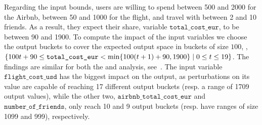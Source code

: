 %
%
Regarding the input bounds, users are willing to spend between 500 and 2000 for the Airbnb, between 50 and 1000 for the flight, and travel with between 2 and 10 friends. As a result, they expect their share, variable $\texttt{total\_cost\_eur}$, to be between 90 and 1900.
To compute the impact of the input variables we choose the output buckets to cover the expected output space in buckets of size $100$, \ie, $\{100t + 90 \le \texttt{total\_cost\_eur} < \min \{100(t + 1) + 90, 1900\} \mid 0 \le t \le 19\}$.
The %
findings are similar for both the \outcomesname{} and \rangename{} analysis, see~.
The input variable $\texttt{flight\_cost\_usd}$ has the biggest impact on the output, as perturbations on its value are capable of reaching 17 different output buckets (resp. a range of 1709 output values), while the other two, $\texttt{airbnb\_total\_cost\_eur}$ and $\texttt{number\_of\_friends}$, only reach 10 and 9 output buckets (resp. have ranges of size 1099 and 999), respectively.

